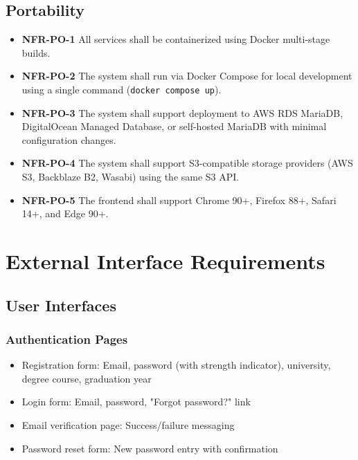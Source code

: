 \documentclass[12pt,a4paper]{article}
\begin{document}
\subsection{Portability}

\begin{itemize}
    \item \textbf{NFR-PO-1} All services shall be containerized using Docker multi-stage builds.
    \item \textbf{NFR-PO-2} The system shall run via Docker Compose for local development using a single command (\texttt{docker compose up}).
    \item \textbf{NFR-PO-3} The system shall support deployment to AWS RDS MariaDB, DigitalOcean Managed Database, or self-hosted MariaDB with minimal configuration changes.
    \item \textbf{NFR-PO-4} The system shall support S3-compatible storage providers (AWS S3, Backblaze B2, Wasabi) using the same S3 API.
    \item \textbf{NFR-PO-5} The frontend shall support Chrome 90+, Firefox 88+, Safari 14+, and Edge 90+.
\end{itemize}

\section{External Interface Requirements}

\subsection{User Interfaces}

\subsubsection{Authentication Pages}

\begin{itemize}
    \item Registration form: Email, password (with strength indicator), university, degree course, graduation year
    \item Login form: Email, password, "Forgot password?" link
    \item Email verification page: Success/failure messaging
    \item Password reset form: New password entry with confirmation
\end{itemize}
\end{document}
